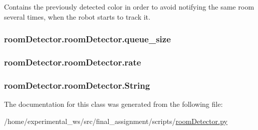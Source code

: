 Contains the previously detected color in order to avoid notifying the same room several times, when the robot starts to track it. 

\subsubsection[{\texorpdfstring{queue\+\_\+size}{queue_size}}]{\setlength{\rightskip}{0pt plus 5cm}room\+Detector.\+room\+Detector.\+queue\+\_\+size\hspace{0.3cm}{\ttfamily [static]}}\hypertarget{classroomDetector_1_1roomDetector_a86aaaea08936260cb6e591c10b0dfeae}{}\label{classroomDetector_1_1roomDetector_a86aaaea08936260cb6e591c10b0dfeae}
\subsubsection[{\texorpdfstring{rate}{rate}}]{\setlength{\rightskip}{0pt plus 5cm}room\+Detector.\+room\+Detector.\+rate\hspace{0.3cm}{\ttfamily [static]}}\hypertarget{classroomDetector_1_1roomDetector_ad3dbc1e4c7a827af098c86101198a1f4}{}\label{classroomDetector_1_1roomDetector_ad3dbc1e4c7a827af098c86101198a1f4}
\subsubsection[{\texorpdfstring{String}{String}}]{\setlength{\rightskip}{0pt plus 5cm}room\+Detector.\+room\+Detector.\+String\hspace{0.3cm}{\ttfamily [static]}}\hypertarget{classroomDetector_1_1roomDetector_a14b6749ddaf264a41497904c0513ed9b}{}\label{classroomDetector_1_1roomDetector_a14b6749ddaf264a41497904c0513ed9b}


The documentation for this class was generated from the following file\+:\begin{DoxyCompactItemize}
\item 
/home/experimental\+\_\+ws/src/final\+\_\+assignment/scripts/\hyperlink{roomDetector_8py}{room\+Detector.\+py}\end{DoxyCompactItemize}
